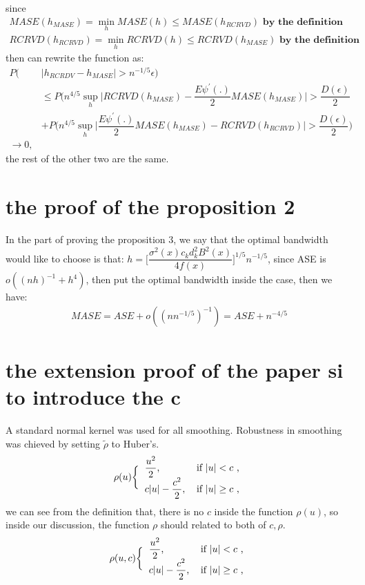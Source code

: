 \documentclass[12pt]{amsart}
\begin{document}
since 
\begin{align}
MASE(h_{MASE})=\min_{h}MASE(h)\leq MASE(h_{RCRVD}) \textbf{ by the definition }\nonumber\\
RCRVD(h_{RCRVD})=\min_{h}RCRVD(h)\leq RCRVD(h_{MASE})\textbf{ by the definition }\nonumber
\end{align}
then can rewrite the function as:
\begin{align}
P(&|h_{RCRDV}-h_{MASE}|>n^{-1/5}\epsilon)\nonumber\\
&\leq P\bigg(n^{4/5}\sup_{h}\bigg|RCRVD(h_{MASE})-\dfrac{E\psi^{'}(.)}{2}MASE(h_{MASE})\bigg|> \dfrac{D(\epsilon)}{2}\nonumber\\
&+P\bigg(n^{4/5}\sup_{h}|\dfrac{E\psi^{'}(.)}{2}MASE(h_{MASE})-RCRVD(h_{RCRVD})\bigg|>\dfrac{D(\epsilon)}{2}\bigg)\nonumber\\
\longrightarrow 0,\nonumber
\end{align}
the rest of the other two are the same.
\section{the proof of the proposition 2}
In the part of proving the proposition 3, we say that the optimal bandwidth would like to choose is that: $ h=\bigg[\dfrac{\sigma^{2}(x)c_{k}d^{2}_{k}B^{2}(x)}{4f(x)}\bigg]^{1/5}n^{-1/5}$, since ASE is $ o((nh)^{-1}+h^{4}) $, then put the optimal bandwidth inside the case, then we have:
\begin{align}
MASE=ASE+o((nn^{-1/5})^{-1})=ASE+n^{-4/5}
\end{align}







\section{the extension proof of the paper si to introduce the c}
A standard normal kernel was used for all smoothing. Robustness in smoothing was chieved by setting $\widetilde{\rho}$ to Huber's.
\begin{align}
\rho(u) \bigg\{
  \begin{tabular}{ll}
   $\dfrac{u^2}{2}$, & if $|u|<c$ , \\
  $c|u|-\dfrac{c^2}{2}$,& if $|u|\geq c$ ,
  \end{tabular}
\end{align}
we can see from the definition that, there is no $c$ inside the function $\rho(u)$, so inside our discussion, the function $\rho$ should related to both of $c, \rho$.
\begin{align}
\rho(u,c) \bigg\{
  \begin{tabular}{ll}
   $\dfrac{u^2}{2}$, & if $|u|<c$ , \\
  $c|u|-\dfrac{c^2}{2}$,& if $|u|\geq c$ ,
  \end{tabular}
\end{align}
\end{document}

